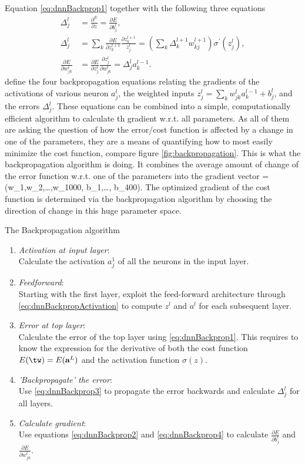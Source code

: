 Equation \ref{eq:dnnBackprop1} together with the following three equations
\begin{align}
	\Delta^l_j&= \frac{\partial^E}{\partial z} = \frac{\partial E}{\partial b^l_j}, \label{eq:dnnBackprop2} \\
	\Delta^l_j &= \sum_k \frac{\partial E}{\partial z^{l+1}_k} \frac{\partial z^{l+1}_k}{z^l_j} =\left(\sum_k \Delta^{l+1}_k w^{l+1}_{kj} \right) \sigma^\prime(z^l_j), \label{eq:dnnBackprop3} \\
	\frac{\partial E}{\partial w^l_{jk}} &= \frac{\partial E}{\partial z^l_j} \frac{\partial z^l_j}{\partial w^l_{jk}} = \Delta^l_j a^{l-1}_k.\label{eq:dnnBackprop4}
\end{align}
define the four backpropagation equations relating the gradients of the activations of various neuron $a^l_j$, the weighted inputs $z^l_j=\sum_k w^l_{jk} a^{l-1}_k +b^l_j$, and the errors $\Delta^l_j$. These equations can be combined into a simple, computationally efficient algorithm to calculate th gradient w.r.t. all parameters. As all of them are asking the question of how the error/cost function is affected by a change in one of the parameters, they are  a means of quantifying how to most easily minimize the cost function, compare figure \ref{fig:backpropagation}. This is what the backpropagation algorithm is doing. It combines the average amount of change of the error function w.r.t. one of the parameters into the gradient vector
\bse 
\vec{\nabla} \mC = (w_1,w_2,\dots,w_{1000}, b_1,\dots, b_{400}).
\ese 
The optimized gradient of the cost function is determined via the backpropagation algorithm by choosing the direction of change in this huge parameter space.
\begin{mybox}{The Backpropagation algorithm}
	\begin{enumerate}
		\item \emph{Activation at input layer}:\\
		Calculate the activation $a^1_j$ of all the neurons in the input layer.
		\item \emph{Feedforward}:\\
		Starting with the first layer, exploit the feed-forward architecture through \ref{eq:dnnBackpropActivation} to compute $z^l$ and $a^l$ for each subsequent layer.
		\item \emph{Error at top layer}:\\
		Calculate the error of the top layer using \ref{eq:dnnBackprop1}. This requires to know the expression for the derivative of both the cost function $E(\tw)=E(\textbf{a}^L)$ and the activation function $\sigma(z)$.
		\item \emph{’Backpropagate’ the error}:\\
		Use \ref{eq:dnnBackprop3} to propagate the error backwards and calculate $\Delta^l_j$ for all layers. 
		\item \emph{Calculate gradient}:\\
		Use equations \ref{eq:dnnBackprop2} and \ref{eq:dnnBackprop4} to calculate $\frac{\partial E}{\partial b^l_j}$ and $\frac{\partial E}{\partial w^l_{jk}}$.
	\end{enumerate}
\end{mybox}
